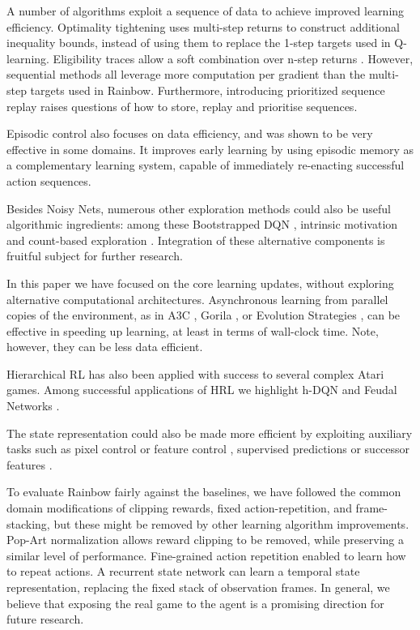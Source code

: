 \documentclass[letterpaper]{article} \usepackage{aaai18}  \usepackage{times}  \usepackage{helvet}  \usepackage{courier}  \usepackage{url}  \usepackage{graphicx}  \usepackage{amsmath,amssymb}
\begin{document}
A number of algorithms exploit a sequence of data to achieve improved learning efficiency. Optimality tightening \cite{HeLSP16} uses multi-step returns to construct additional inequality bounds, instead of using them to replace the 1-step targets used in Q-learning. Eligibility traces allow a soft combination over n-step returns \cite{Sutton:1988}. However, sequential methods all leverage more computation per gradient than the multi-step targets used in Rainbow. Furthermore, introducing prioritized sequence replay raises questions of how to store, replay and prioritise sequences. 

Episodic control \cite{Episodic} also focuses on data efficiency, and was shown to be very effective in some domains. It improves early learning by using episodic memory as a complementary learning system, capable of immediately re-enacting successful action sequences.

Besides Noisy Nets, numerous other exploration methods could also be useful algorithmic ingredients: among these Bootstrapped DQN \cite{Osband2016DeepEV}, intrinsic motivation \cite{StadieLA15} and count-based exploration \cite{Bellemare2016UnifyingCE}. Integration of these alternative components is fruitful subject for further research.

In this paper we have focused on the core learning updates, without exploring alternative computational architectures. Asynchronous learning from parallel copies of the environment, as in A3C \cite{Mnih:2016}, Gorila \cite{Nair2015}, or Evolution Strategies \cite{nes_atari}, can be effective in speeding up learning, at least in terms of wall-clock time. Note, however, they can be less data efficient.

Hierarchical RL has also been applied with success to several complex Atari games. Among successful applications of HRL we highlight h-DQN \cite{hDQN} and Feudal Networks \cite{Feudal}.

The state representation could also be made more efficient by exploiting auxiliary tasks such as pixel control or feature control \cite{JaderbergMCSLSK16}, supervised predictions \cite{DosovitskiyK16} or successor features \cite{kulkarni2016deep}.

To evaluate Rainbow fairly against the baselines, we have followed the common domain modifications of clipping rewards, fixed action-repetition, and frame-stacking, but these might be removed by other learning algorithm improvements. Pop-Art normalization \cite{PopNIPS} allows reward clipping to be removed, while preserving a similar level of performance. Fine-grained action repetition \cite{sharma2017learning} enabled to learn how to repeat actions. A recurrent state network \cite{hausknecht2015deep} can learn a temporal state representation, replacing the fixed stack of observation frames. In general, we believe that exposing the real game to the agent is a promising direction for future research.
\end{document}
